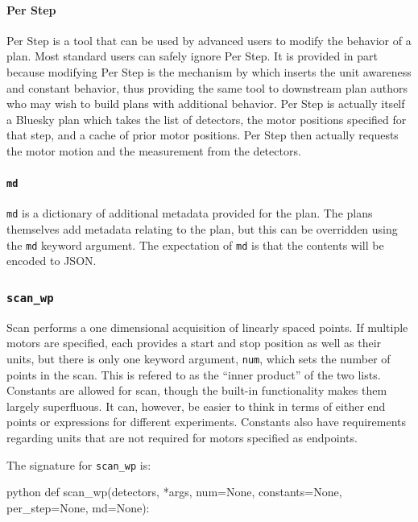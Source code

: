 \paragraph{Per Step}

Per Step is a tool that can be used by advanced users to modify the behavior of a plan.
Most standard users can safely ignore Per Step.
It is provided in part because modifying Per Step is the mechanism by which \wrightplans inserts the unit awareness and constant behavior, thus providing the same tool to downstream plan authors who may wish to build plans with additional behavior.
Per Step is actually itself a Bluesky plan which takes the list of detectors, the motor positions specified for that step, and a cache of prior motor positions.
Per Step then actually requests the motor motion and the measurement from the detectors.

\paragraph{\texttt{md}}
\texttt{md} is a dictionary of additional metadata provided for the plan.
The plans themselves add metadata relating to the plan, but this can be overridden using the \texttt{md} keyword argument.
The expectation of \texttt{md} is that the contents will be encoded to JSON.

\subsubsection{\texttt{scan\_wp}}

Scan performs a one dimensional acquisition of linearly spaced points.
If multiple motors are specified, each provides a start and stop position as well as their units, but there is only one keyword argument, \texttt{num}, which sets the number of points in the scan.
This is refered to as the ``inner product'' of the two lists.
Constants are allowed for scan, though the built-in functionality makes them largely superfluous.
It can, however, be easier to think in terms of either end points or expressions for different experiments.
Constants also have requirements regarding units that are not required for motors specified as endpoints.

The signature for \texttt{scan\_wp} is:

\begin{codefragment}{python}
def scan_wp(detectors, *args, num=None, constants=None, per_step=None, md=None):
\end{codefragment}

